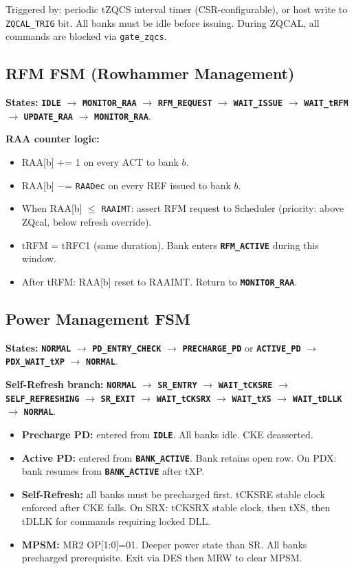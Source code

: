 \documentclass[11pt,a4paper]{article}
\newcommand{\reg}[1]{\textcolor{ddrpurple}{\texttt{#1}}}
\newcommand{\sig}[1]{\textcolor{ddrteal}{\texttt{#1}}}
\newcommand{\state}[1]{\textcolor{ddrblue}{\textbf{\texttt{#1}}}}
\begin{document}
Triggered by: periodic tZQCS interval timer (CSR-configurable), or host
write to \reg{ZQCAL\_TRIG} bit. All banks must be idle before issuing.
During ZQCAL, all commands are blocked via \sig{gate\_zqcs}.

\subsection{RFM FSM (Rowhammer Management)}

\textbf{States:} \state{IDLE} $\to$ \state{MONITOR\_RAA} $\to$
\state{RFM\_REQUEST} $\to$ \state{WAIT\_ISSUE} $\to$
\state{WAIT\_tRFM} $\to$ \state{UPDATE\_RAA} $\to$ \state{MONITOR\_RAA}.

\textbf{RAA counter logic:}
\begin{itemize}[leftmargin=1.5em,itemsep=2pt]
  \item RAA[b] += 1 on every ACT to bank $b$.
  \item RAA[b] $-$= \reg{RAADec} on every REF issued to bank $b$.
  \item When RAA[b] $\leq$ \reg{RAAIMT}: assert RFM request to Scheduler
        (priority: above ZQcal, below refresh override).
  \item tRFM = tRFC1 (same duration). Bank enters \state{RFM\_ACTIVE} during this window.
  \item After tRFM: RAA[b] reset to RAAIMT. Return to \state{MONITOR\_RAA}.
\end{itemize}

\subsection{Power Management FSM}

\textbf{States:}
\state{NORMAL} $\to$ \state{PD\_ENTRY\_CHECK} $\to$
\state{PRECHARGE\_PD} or \state{ACTIVE\_PD} $\to$
\state{PDX\_WAIT\_tXP} $\to$ \state{NORMAL}.

\textbf{Self-Refresh branch:}
\state{NORMAL} $\to$ \state{SR\_ENTRY} $\to$ \state{WAIT\_tCKSRE} $\to$
\state{SELF\_REFRESHING} $\to$ \state{SR\_EXIT} $\to$
\state{WAIT\_tCKSRX} $\to$ \state{WAIT\_tXS} $\to$
\state{WAIT\_tDLLK} $\to$ \state{NORMAL}.

\begin{itemize}[leftmargin=1.5em,itemsep=2pt]
  \item \textbf{Precharge PD:} entered from \state{IDLE}. All banks idle. CKE deasserted.
  \item \textbf{Active PD:} entered from \state{BANK\_ACTIVE}. Bank retains open row.
        On PDX: bank resumes from \state{BANK\_ACTIVE} after tXP.
  \item \textbf{Self-Refresh:} all banks must be precharged first. tCKSRE stable clock
        enforced after CKE falls. On SRX: tCKSRX stable clock, then tXS,
        then tDLLK for commands requiring locked DLL.
  \item \textbf{MPSM:} MR2 OP[1:0]=01. Deeper power state than SR.
        All banks precharged prerequisite. Exit via DES then MRW to clear MPSM.
\end{itemize}
\end{document}
